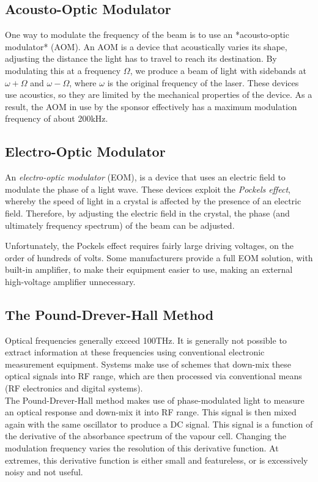 \subsection{Acousto-Optic Modulator}

One way to modulate the frequency of the beam is to use an *acousto-optic modulator* (AOM).  An AOM is a device that acoustically varies its shape, adjusting the distance the light has to travel to reach its destination.  By modulating this at a frequency $\Omega$, we produce a beam of light with sidebands at $\omega + \Omega$ and $\omega - \Omega$, where $\omega$ is the original frequency of the laser. These devices use acoustics, so they are limited by the mechanical properties of the device.  As a result, the AOM in use by the sponsor effectively has a maximum modulation frequency of about 200kHz.

\subsection{Electro-Optic Modulator}

An \emph{electro-optic modulator} (EOM), is a device that uses an electric field to modulate the phase of a light wave.  These devices exploit the \emph{Pockels effect}, whereby the speed of light in a crystal is affected by the presence of an electric field.  Therefore, by adjusting the electric field in the crystal, the phase (and ultimately frequency spectrum) of the beam can be adjusted.

Unfortunately, the Pockels effect requires fairly large driving voltages, on the order of hundreds of volts.  Some manufacturers provide a full EOM solution, with built-in amplifier, to make their equipment easier to use, making an external high-voltage amplifier unnecessary.

\subsection{The Pound-Drever-Hall Method}

Optical frequencies generally exceed 100THz. It is generally not possible to
extract information at these frequencies using conventional
electronic measurement equipment.  Systems make use of
schemes that down-mix these optical signals into RF range, which are then
processed via conventional means (RF electronics and digital systems). \\

The Pound-Drever-Hall method makes use of phase-modulated light to measure an
optical response and down-mix it into RF range.  This signal is then mixed again with the same oscillator to produce a DC signal.  This signal is a function of the derivative of the absorbance spectrum of the vapour cell.  Changing the modulation frequency varies the resolution of this derivative function.  At extremes, this derivative function is either small and featureless, or is excessively noisy and not useful. \\

